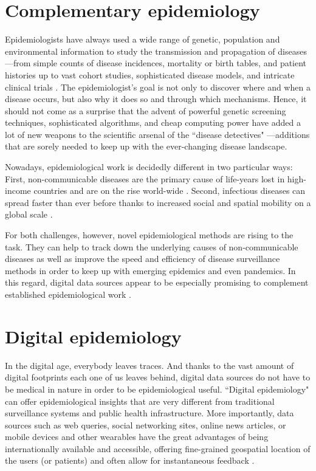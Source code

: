 \documentclass[11pt, a4paper,twoside]{report}\usepackage[]{graphicx}\usepackage[]{color}
\begin{document}
\section{Complementary epidemiology}
Epidemiologists have always used a wide range of genetic, population and environmental information to study the transmission and propagation of diseases---from simple counts of disease incidences, mortality or birth tables, and patient histories up to vast cohort studies, sophisticated disease models, and intricate clinical trials \citep{rothman2012epidemiology,koepsell2014epidemiologic}. The epidemiologist's goal is not only to discover where and when a disease occurs, but also why it does so and through which mechanisms. Hence, it should not come as a surprise that the advent of powerful genetic screening techniques, sophisticated algorithms, and cheap computing power have added a lot of new weapons to the scientific arsenal of the ``disease detectives" \citep{bailey2005introduction, khoury_transforming_2013, gardy_real-time_2015}---additions that are sorely needed to keep up with the ever-changing disease landscape.

Nowadays, epidemiological work is decidedly different in two particular ways: First, non-communicable diseases are the primary cause of life-years lost in high-income countries and are on the rise world-wide \citep{lozano_global_2013}. Second, infectious diseases can spread faster than ever before thanks to increased social and spatial mobility on a global scale \citep{hufnagel_forecast_2004}. 

For both challenges, however, novel epidemiological methods are rising to the task. They can help to track down the underlying causes of non-communicable diseases as well as improve the speed and efficiency of disease surveillance methods in order to keep up with emerging epidemics and even pandemics. In this regard, digital data sources appear to be especially promising to complement established epidemiological work \citep{salathe_digital_2012, simonsen_infectious_2016}.

\section{Digital epidemiology}

In the digital age, everybody leaves traces. And thanks to the vast amount of digital footprints each one of us leaves behind, digital data sources do not have to be medical in nature in order to be epidemiological useful. ``Digital epidemiology" can offer epidemiological insights that are very different from traditional surveillance systems and public health infrastructure. More importantly, data sources such as web queries, social networking sites, online news articles, or mobile devices and other wearables have the great advantages of being internationally available and accessible, offering fine-grained geospatial location of the users (or patients) and often allow for instantaneous feedback \citep{salathe_digital_2012}. 
\end{document}
